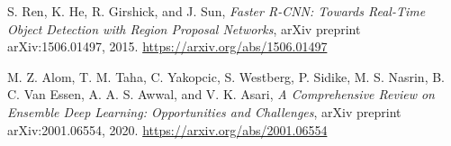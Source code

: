 \documentclass{article}
\begin{document}
\begin{thebibliography}{9}
S. Ren, K. He, R. Girshick, and J. Sun, 
\textit{Faster R-CNN: Towards Real-Time Object Detection with Region Proposal Networks}, 
arXiv preprint arXiv:1506.01497, 2015. 
\url{https://arxiv.org/abs/1506.01497}

M. Z. Alom, T. M. Taha, C. Yakopcic, S. Westberg, P. Sidike, M. S. Nasrin, B. C. Van Essen, A. A. S. Awwal, and V. K. Asari, 
\textit{A Comprehensive Review on Ensemble Deep Learning: Opportunities and Challenges}, 
arXiv preprint arXiv:2001.06554, 2020. 
\url{https://arxiv.org/abs/2001.06554}

\end{thebibliography}
\end{document}
